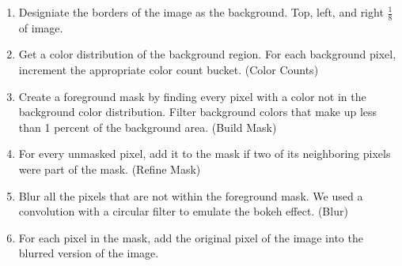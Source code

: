 \documentclass[12pt]{article}
\begin{document}
\begin{enumerate}
    \item
        Designiate the borders of the image as the background. Top, left, and
        right $\tfrac{1}{8}$ of image.
    \item
        Get a color distribution of the background region. For each background
        pixel, increment the appropriate color count bucket. (Color Counts)
    \item
        Create a foreground mask by finding every pixel with a color not
        in the background color distribution. Filter background colors that
        make up less than 1 percent of the background area. (Build Mask)
    \item
        For every unmasked pixel, add it to the mask if two of its neighboring
        pixels were part of the mask. (Refine Mask)
    \item
        Blur all the pixels that are not within the foreground mask. We used a
        convolution with a circular filter to emulate the bokeh effect. (Blur)
    \item
        For each pixel in the mask, add the original pixel of the image into
        the blurred version of the image.
\end{enumerate}
\end{document}

